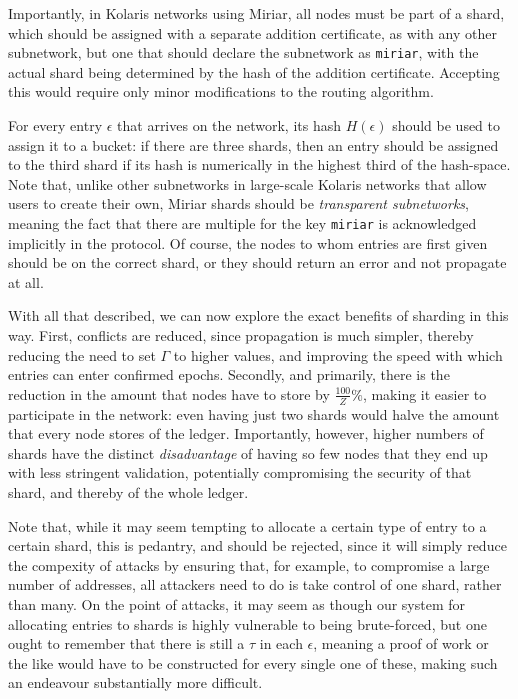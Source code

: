 \documentclass{extreport}
\begin{document}
Importantly, in Kolaris networks using Miriar, all nodes must be part of a shard, which should be assigned with a separate addition certificate, as with any other subnetwork, but one that should declare the subnetwork as \texttt{miriar}, with the actual shard being determined by the hash of the addition certificate. Accepting this would require only minor modifications to the routing algorithm.

For every entry \(\epsilon\) that arrives on the network, its hash \(H(\epsilon)\) should be used to assign it to a bucket: if there are three shards, then an entry should be assigned to the third shard if its hash is numerically in the highest third of the hash-space. Note that, unlike other subnetworks in large-scale Kolaris networks that allow users to create their own, Miriar shards should be \emph{transparent subnetworks}, meaning the fact that there are multiple for the key \texttt{miriar} is acknowledged implicitly in the protocol. Of course, the nodes to whom entries are first given should be on the correct shard, or they should return an error and not propagate at all.

With all that described, we can now explore the exact benefits of sharding in this way. First, conflicts are reduced, since propagation is much simpler, thereby reducing the need to set \(\Gamma\) to higher values, and improving the speed with which entries can enter confirmed epochs. Secondly, and primarily, there is the reduction in the amount that nodes have to store by \(\frac{100}{Z}\%\), making it easier to participate in the network: even having just two shards would halve the amount that every node stores of the ledger. Importantly, however, higher numbers of shards have the distinct \emph{disadvantage} of having so few nodes that they end up with less stringent validation, potentially compromising the security of that shard, and thereby of the whole ledger.

Note that, while it may seem tempting to allocate a certain type of entry to a certain shard, this is pedantry, and should be rejected, since it will simply reduce the compexity of attacks by ensuring that, for example, to compromise a large number of addresses, all attackers need to do is take control of one shard, rather than many. On the point of attacks, it may seem as though our system for allocating entries to shards is highly vulnerable to being brute-forced, but one ought to remember that there is still a \(\tau\) in each \(\epsilon\), meaning a proof of work or the like would have to be constructed for every single one of these, making such an endeavour substantially more difficult.
\end{document}
